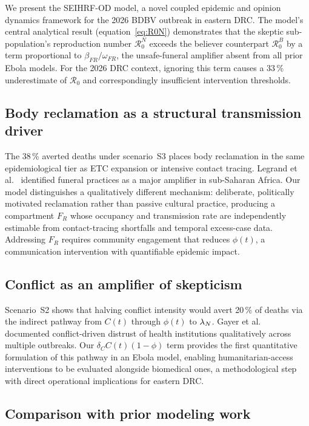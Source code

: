 \documentclass[12pt,a4paper]{article}
\begin{document}
We present the SEIHRF-OD model, a novel coupled epidemic and opinion dynamics
framework for the 2026 BDBV outbreak in eastern DRC. The model's central
analytical result (equation~\eqref{eq:R0N}) demonstrates that the skeptic
sub-population's reproduction number $\mathcal{R}_0^N$ exceeds the believer
counterpart $\mathcal{R}_0^B$ by a term proportional to $\beta_{FR}/\omega_{FR}$,
the unsafe-funeral amplifier absent from all prior Ebola models. For the 2026
DRC context, ignoring this term causes a 33\,\% underestimate of $\mathcal{R}_0$
and correspondingly insufficient intervention thresholds.

\subsection{Body reclamation as a structural transmission driver}

The 38\,\% averted deaths under scenario~S3 places body reclamation in the
same epidemiological tier as ETC expansion or intensive contact tracing.
Legrand et al.\ \citep{Legrand2007} identified funeral practices as a major
amplifier in sub-Saharan Africa. Our model distinguishes a qualitatively
different mechanism: deliberate, politically motivated reclamation rather than
passive cultural practice, producing a compartment $F_R$ whose occupancy and
transmission rate are independently estimable from contact-tracing shortfalls
and temporal excess-case data. Addressing $F_R$ requires community engagement
that reduces $\phi(t)$, a communication intervention with quantifiable
epidemic impact.

\subsection{Conflict as an amplifier of skepticism}

Scenario~S2 shows that halving conflict intensity would avert 20\,\% of
deaths via the indirect pathway from $C(t)$ through $\phi(t)$ to $\lambda_N$. Gayer et al.\
\citep{Gayer2007} documented conflict-driven distrust of health institutions
qualitatively across multiple outbreaks. Our $\delta_C C(t)(1-\phi)$ term
provides the first quantitative formulation of this pathway in an Ebola model,
enabling humanitarian-access interventions to be evaluated alongside
biomedical ones, a methodological step with direct operational implications
for eastern DRC.

\subsection{Comparison with prior modeling work}
\end{document}
